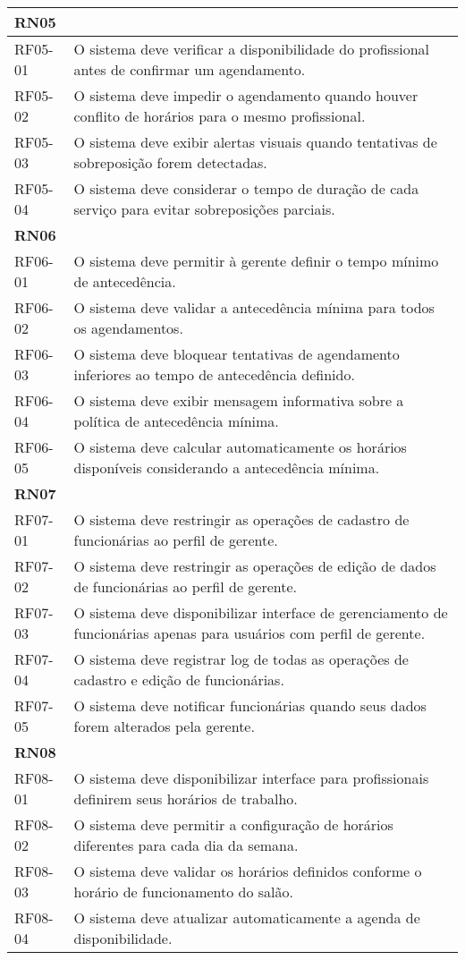 \begin{longtable}{|p{}|p{}|}
	\multicolumn{2}{|l|}{\textbf{RN05}} \\ \hline
	RF05-01 & O sistema deve verificar a disponibilidade do profissional antes de confirmar um agendamento. \\ \hline
	RF05-02 & O sistema deve impedir o agendamento quando houver conflito de horários para o mesmo profissional. \\ \hline
	RF05-03 & O sistema deve exibir alertas visuais quando tentativas de sobreposição forem detectadas. \\ \hline
	RF05-04 & O sistema deve considerar o tempo de duração de cada serviço para evitar sobreposições parciais. \\ \hline
	
	\multicolumn{2}{|l|}{\textbf{RN06}} \\ \hline
	RF06-01 & O sistema deve permitir à gerente definir o tempo mínimo de antecedência. \\ \hline
	RF06-02 & O sistema deve validar a antecedência mínima para todos os agendamentos. \\ \hline
	RF06-03 & O sistema deve bloquear tentativas de agendamento inferiores ao tempo de antecedência definido. \\ \hline
	RF06-04 & O sistema deve exibir mensagem informativa sobre a política de antecedência mínima. \\ \hline
	RF06-05 & O sistema deve calcular automaticamente os horários disponíveis considerando a antecedência mínima. \\ \hline
	
	\multicolumn{2}{|l|}{\textbf{RN07}} \\ \hline
	RF07-01 & O sistema deve restringir as operações de cadastro de funcionárias ao perfil de gerente. \\ \hline
	RF07-02 & O sistema deve restringir as operações de edição de dados de funcionárias ao perfil de gerente. \\ \hline
	RF07-03 & O sistema deve disponibilizar interface de gerenciamento de funcionárias apenas para usuários com perfil de gerente. \\ \hline
	RF07-04 & O sistema deve registrar log de todas as operações de cadastro e edição de funcionárias. \\ \hline
	RF07-05 & O sistema deve notificar funcionárias quando seus dados forem alterados pela gerente. \\ \hline
	
	\multicolumn{2}{|l|}{\textbf{RN08}} \\ \hline
	RF08-01 & O sistema deve disponibilizar interface para profissionais definirem seus horários de trabalho. \\ \hline
	RF08-02 & O sistema deve permitir a configuração de horários diferentes para cada dia da semana. \\ \hline
	RF08-03 & O sistema deve validar os horários definidos conforme o horário de funcionamento do salão. \\ \hline
	RF08-04 & O sistema deve atualizar automaticamente a agenda de disponibilidade. \\ \hline
	

\end{longtable}
